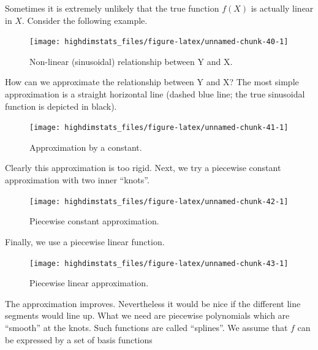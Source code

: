 \documentclass[
]{book}
\begin{document}
Sometimes it is extremely unlikely that the true function \(f(X)\) is actually linear in \(X\). Consider the following example.

\begin{figure}

{\centering \texttt{[image: highdimstats\_files/figure-latex/unnamed-chunk-40-1]} 

}

\caption{Non-linear (sinusoidal) relationship between Y and X.}\label{fig:unnamed-chunk-40}
\end{figure}

How can we approximate the relationship between Y and X?
The most simple approximation is a straight horizontal line (dashed blue line; the true sinusoidal function is depicted in black).

\begin{figure}

{\centering \texttt{[image: highdimstats\_files/figure-latex/unnamed-chunk-41-1]} 

}

\caption{Approximation by a constant.}\label{fig:unnamed-chunk-41}
\end{figure}

Clearly this approximation is too rigid. Next, we try a piecewise constant approximation with two inner ``knots''.

\begin{figure}

{\centering \texttt{[image: highdimstats\_files/figure-latex/unnamed-chunk-42-1]} 

}

\caption{Piecewise constant approximation.}\label{fig:unnamed-chunk-42}
\end{figure}

Finally, we use a piecewise linear function.

\begin{figure}

{\centering \texttt{[image: highdimstats\_files/figure-latex/unnamed-chunk-43-1]} 

}

\caption{Piecewise linear approximation.}\label{fig:unnamed-chunk-43}
\end{figure}

The approximation improves. Nevertheless it would be nice if the different line segments would line up. What we need are piecewise polynomials which are ``smooth'' at the knots. Such functions are called ``splines''. We assume that \(f\) can be expressed by a set of basis functions
\end{document}
